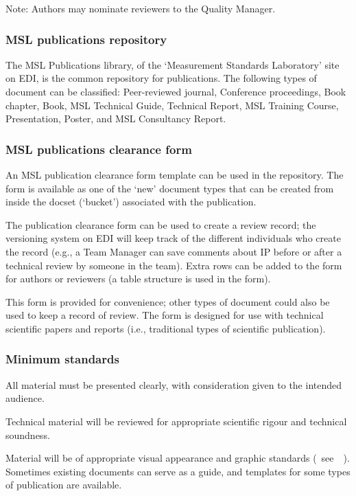 Note: Authors may nominate reviewers to the Quality Manager.

\subsubsection{MSL publications repository}
 \label{sss:publications_repository}
The MSL Publications library, of the ‘Measurement Standards Laboratory’ site on EDI, is the common repository for publications.  The following types of document can be classified: Peer-reviewed journal, Conference proceedings, Book chapter, Book, MSL Technical Guide, Technical Report, MSL Training Course, Presentation, Poster, and MSL Consultancy Report. 

\subsubsection{MSL publications clearance form}
An MSL publication clearance form template can be used in the repository. The form is available as one of the ‘new’ document types that can be created from inside the docset (‘bucket’) associated with the publication.

The publication clearance form can be used to create a review record; the versioning system on EDI will keep track of the different individuals who create the record (e.g., a Team Manager can save comments about IP before or after a technical review by someone in the team). Extra rows can be added to the form for authors or reviewers (a table structure is used in the form).

This form is provided for convenience; other types of document could also be used to keep a record of review. The form is designed for use with technical scientific papers and reports (i.e., traditional types of scientific publication).  

\subsubsection{Minimum standards}
All material must be presented clearly, with consideration given to the intended audience.

Technical material will be reviewed for appropriate scientific rigour and technical soundness. 

Material will be of appropriate visual appearance and graphic standards (~see~\cite{MSL_Reporting_Guidelines}~). Sometimes existing documents can serve as a guide, and templates for some types of publication are available.  

